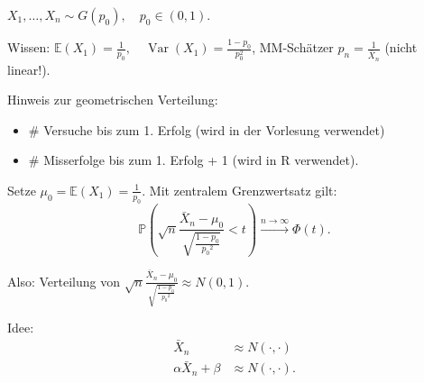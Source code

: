 \documentclass{tstextbook}
\DeclareMathOperator{\Var}{Var}
\newcommand{\E}{\mathbb E}
\newcommand{\Prob}{\mathbb P}
\begin{document}
\begin{example}
	$ X_1, \ldots, X_n \sim G(p_0), \quad p_0 \in (0,1) $. 
	
	Wissen: $ \E(X_1) = \frac{1}{p_0}, \quad \Var(X_1) = \frac{1-p_0}{p_0^2} $, MM-Schätzer $ \hat{p}_n = \frac{1}{\bar{X}_n} $ (nicht linear!).
	
	Hinweis zur geometrischen Verteilung: 
	\begin{itemize}
	\item $ \# $ Versuche bis zum 1. Erfolg (wird in der Vorlesung verwendet)
	\item $ \# $ Misserfolge bis zum 1. Erfolg + 1 (wird in R verwendet).
	\end{itemize}

	Setze $ \mu_0 = \E(X_1) = \frac{1}{p_0} $. Mit zentralem Grenzwertsatz gilt: 
	\[
	\Prob\left(\sqrt{n} \frac{\bar{X}_n - \mu_0}{\sqrt{\frac{1-p_0}{{p_0}^2}}} < t \right) \xrightarrow{n\to\infty} \Phi(t).
	\]
	
	Also: Verteilung von $ \sqrt{n} \frac{\bar{X}_n - \mu_0}{\sqrt{\frac{1-p_0}{{p_0}^2}}} \approx N(0,1) $.
	
	Idee: \[
	\begin{aligned}
		\bar{X}_n & \approx N(\cdot,\cdot) \\
		\alpha \bar{X}_n + \beta & \approx N(\cdot,\cdot).
	\end{aligned}
	\]
\end{example}



\printindex
\end{document}
